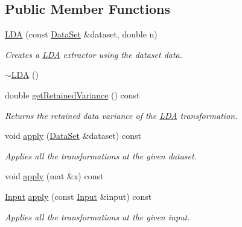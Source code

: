 \subsection*{Public Member Functions}
\begin{DoxyCompactItemize}
\item 
\hyperlink{classhappyml_1_1LDA_a999cf366ac462e1c22452b0a2b0c9298}{L\+DA} (const \hyperlink{classhappyml_1_1DataSet}{Data\+Set} \&dataset, double n)
\begin{DoxyCompactList}\small\item\em Creates a \hyperlink{classhappyml_1_1LDA}{L\+DA} extractor using the dataset data. \end{DoxyCompactList}\item 
\hyperlink{classhappyml_1_1LDA_a48b3e54c10cece4086005ee65ed405e8}{$\sim$\+L\+DA} ()
\item 
double \hyperlink{classhappyml_1_1LDA_a51210380f50380f77644fabbe1a89614}{get\+Retained\+Variance} () const 
\begin{DoxyCompactList}\small\item\em Returns the retained data variance of the \hyperlink{classhappyml_1_1LDA}{L\+DA} transformation. \end{DoxyCompactList}\item 
void \hyperlink{classhappyml_1_1LDA_a642ebe3b7cfcddaa5b21cd93ed1cf082}{apply} (\hyperlink{classhappyml_1_1DataSet}{Data\+Set} \&dataset) const 
\begin{DoxyCompactList}\small\item\em Applies all the transformations at the given dataset. \end{DoxyCompactList}\item 
void \hyperlink{classhappyml_1_1LDA_aca3f8a0da485bc1d6804fb0dc76dd4fc}{apply} (mat \&x) const 
\item 
\hyperlink{namespacehappyml_a03602d1ec49393790b8a0449f40cd01f}{Input} \hyperlink{classhappyml_1_1LDA_a2b98a4675abdb0985347491224136b5c}{apply} (const \hyperlink{namespacehappyml_a03602d1ec49393790b8a0449f40cd01f}{Input} \&input) const 
\begin{DoxyCompactList}\small\item\em Applies all the transformations at the given input. \end{DoxyCompactList}\end{DoxyCompactItemize}
